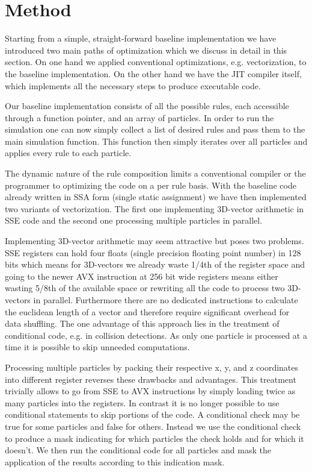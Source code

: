 \section{Method}\label{sec:method}

Starting from a simple, straight-forward baseline implementation we have introduced two main paths of optimization which we discuss in detail in this section. On one hand we applied conventional optimizations, e.g. vectorization, to the baseline implementation. On the other hand we have the JIT compiler itself, which implements all the necessary steps to produce executable code.

Our baseline implementation consists of all the possible rules, each accessible through a function pointer, and an array of particles. In order to run the simulation one can now simply collect a list of desired rules and pass them to the main simulation function. This function then simply iterates over all particles and applies every rule to each particle.

The dynamic nature of the rule composition limits a conventional compiler or the programmer to optimizing the code on a per rule basis. With the baseline code already written in SSA form (single static assignment) we have then implemented two variants of vectorization. The first one implementing 3D-vector arithmetic in SSE code and the second one processing multiple particles in parallel.

Implementing 3D-vector arithmetic may seem attractive but poses two problems. SSE registers can hold four floats (single precision floating point number) in 128 bits which means for 3D-vectors we already waste 1/4th of the register space and going to the newer AVX instruction at 256 bit wide registers means either wasting 5/8th of the available space or rewriting all the code to process two 3D-vectors in parallel. Furthermore there are no dedicated instructions to calculate the euclidean length of a vector and therefore require significant overhead for data shuffling. The one advantage of this approach lies in the treatment of conditional code, e.g. in collision detections. As only one particle is processed at a time it is possible to skip unneeded computations.

Processing multiple particles by packing their respective x, y, and z coordinates into different register reverses these drawbacks and advantages. This treatment trivially allows to go from SSE to AVX instructions by simply loading twice as many particles into the registers. In contrast it is no longer possible to use conditional statements to skip portions of the code. A conditional check may be true for some particles and false for others. Instead we use the conditional check to produce a mask indicating for which particles the check holds and for which it doesn't. We then run the conditional code for all particles and mask the application of the results according to this indication mask.

